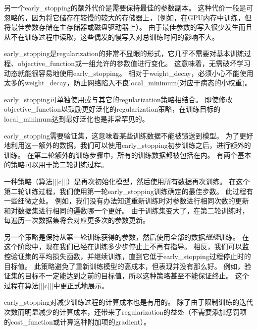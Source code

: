 另一个\gls{early_stopping}的额外代价是需要保持最佳的参数副本。
这种代价一般是可忽略的，因为将它储存在较慢的较大的存储器上，（例如，在GPU内存中训练，但将最佳参数存储在主存储器或磁盘驱动器上）。
由于最佳参数的写入很少发生而且从不在训练过程中读取，这些偶发的慢写入对总训练时间的影响不大。


\gls{early_stopping}是\gls{regularization}的非常不显眼的形式，它几乎不需要对基本训练过程、\gls{objective_function}或一组允许的参数值进行变化。
这意味着，无需破坏学习动态就能很容易地使用\gls{early_stopping}。
相对于\gls{weight_decay}，必须小心不能使用太多的\gls{weight_decay}，防止网络陷入不良\gls{local_minimum}(对应于病态的小权重)。

\gls{early_stopping}可单独使用或与其它的\gls{regularization}策略相结合。
即使修改\gls{objective_function}以鼓励更好泛化的\gls{regularization}策略，在训练目标的\gls{local_minimum}达到最好泛化也是非常罕见的。

\gls{early_stopping}需要验证集，这意味着某些训练数据不能被馈送到模型。
为了更好地利用这一额外的数据，我们可以使用\gls{early_stopping}初步训练之后，进行额外的训练。
在第二轮额外的训练步骤中，所有的训练数据都被包括在内。
有两个基本的策略可以用于第二轮训练过程。


一种策略（算法|||c|||）是再次初始化模型，然后使用所有数据再次训练。
在这个第二轮训练过程，我们使用第一轮\gls{early_stopping}训练确定的最佳步数。
此过程有一些细微之处。
例如，我们没有办法知道重新训练时对参数进行相同次数的更新和对数据集进行相同的遍数哪一个更好。
由于训练集变大了，在第二轮训练时，每遍历一次数据集将会对应更多次的参数更新。

另一个策略是保持从第一轮训练获得的参数，然后使用全部的数据\emph{继续}训练。
在这个阶段中，现在我们已经在训练多少步停止上不再有指导。
相反，我们可以监控验证集的平均损失函数，并继续训练，直到它低于\gls{early_stopping}过程停止时的目标值。
此策略避免了重新训练模型的高成本，但表现并没有那么好。
例如，验证集的目标不一定能达到之前的目标值，所以这种策略甚至不能保证终止。
这个过程在算法|||c|||中更正式地展示。

\gls{early_stopping}对减少训练过程的计算成本也是有用的。
除了由于限制训练的迭代次数而明显减少的计算成本，还带来了\gls{regularization}的益处（不需要添加惩罚项的\gls{cost_function}或计算这种附加项的\gls{gradient}）。


